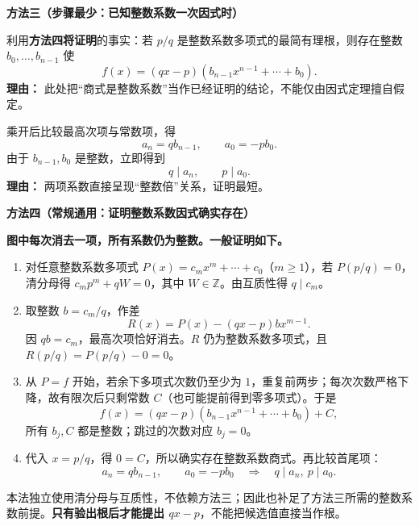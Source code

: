 \clearpage
\begin{proofbox}
    \textbf{\textcolor{CProof}{方法三（步骤最少：已知整数系数一次因式时）}}

    \begin{description}[style=nextline, leftmargin=2.8em, labelsep=0.5em, itemsep=0.48em]
        \item[\textbf{步骤一（利用整数系数分解）：}]
            利用\textbf{方法四将证明}的事实：若 $p/q$ 是整数系数多项式的最简有理根，则存在整数 $b_0,\ldots,b_{n-1}$ 使
            \[
             f(x)=(qx-p)(b_{n-1}x^{n-1}+\cdots+b_0).
            \]
            \textbf{理由：} 此处把“商式是整数系数”当作已经证明的结论，不能仅由因式定理擅自假定。
        \item[\textbf{步骤二（只比首尾两项）：}]
            乘开后比较最高次项与常数项，得
            \[
               a_n=qb_{n-1},\qquad a_0=-pb_0.
            \]
            由于 $b_{n-1},b_0$ 是整数，立即得到
            \[
               \boxed{q\mid a_n,\qquad p\mid a_0.}
            \]
            \textbf{理由：} 两项系数直接呈现“整数倍”关系，证明最短。
    \end{description}

    \medskip
\end{proofbox}
\clearpage
\begin{proofbox}
    \textbf{\textcolor{CProof}{方法四（常规通用：证明整数系数因式确实存在）}}


    \textbf{图中每次消去一项，所有系数仍为整数。一般证明如下。}
    \begin{enumerate}[leftmargin=*,itemsep=0.65em]
    \item 对任意整数系数多项式 $P(x)=c_mx^m+\cdots+c_0$（$m\ge1$），若 $P(p/q)=0$，清分母得 $c_mp^m+qW=0$，其中 $W\in\mathbb Z$。由互质性得 $q\mid c_m$。
    \item 取整数 $b=c_m/q$，作差
    \[
      R(x)=P(x)-(qx-p)bx^{m-1}.
    \]
    因 $qb=c_m$，最高次项恰好消去。$R$ 仍为整数系数多项式，且 $R(p/q)=P(p/q)-0=0$。
    \item 从 $P=f$ 开始，若余下多项式次数仍至少为 $1$，重复前两步；每次次数严格下降，故有限次后只剩常数 $C$（也可能提前得到零多项式）。于是
    \[
      f(x)=(qx-p)(b_{n-1}x^{n-1}+\cdots+b_0)+C,
    \]
    所有 $b_j,C$ 都是整数；跳过的次数对应 $b_j=0$。
    \item 代入 $x=p/q$，得 $0=C$，所以确实存在整数系数商式。再比较首尾项：
    \[
      a_n=qb_{n-1},\qquad a_0=-pb_0
      \quad\Longrightarrow\quad q\mid a_n,\ p\mid a_0.
    \]
    \end{enumerate}
    本法独立使用清分母与互质性，不依赖方法三；因此也补足了方法三所需的整数系数前提。\textbf{只有验出根后才能提出 $qx-p$}，不能把候选值直接当作根。
\end{proofbox}
\clearpage
